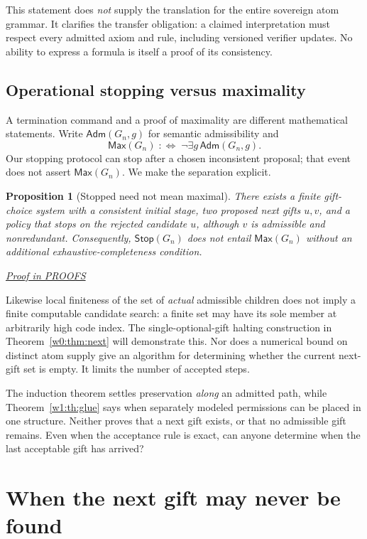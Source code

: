 \documentclass[11pt,letterpaper]{article}
\newtheorem{proposition}[theorem]{Proposition}
\theoremstyle{definition}\newtheorem{definition}[theorem]{Definition}\newtheorem{example}[theorem]{Example}
\theoremstyle{remark}\newtheorem{remark}[theorem]{Remark}
\newcommand{\Adm}{\mathsf{Adm}}
\newcommand{\prooflink}[1]{\par\noindent\hfill\small\hyperref[#1]{\textit{Proof in PROOFS}}\normalsize}
\begin{document}
This statement does \emph{not} supply the translation for the entire sovereign
atom grammar.  It clarifies the transfer obligation: a claimed interpretation
must respect every admitted axiom and rule, including versioned verifier
updates.  No ability to express a formula is itself a proof of its consistency.

\subsection{Operational stopping versus maximality}
A termination command and a proof of maximality are different mathematical statements. Write $\Adm(G_n,g)$ for semantic admissibility and
\[
 \mathsf{Max}(G_n)\;:\Longleftrightarrow\;\neg\exists g\,\Adm(G_n,g).
\]
Our stopping protocol can stop after a chosen inconsistent proposal; that event does not assert $\mathsf{Max}(G_n)$. We make the separation explicit.

\begin{proposition}[Stopped need not mean maximal]\label{w1:prop:stop}
There exists a finite gift-choice system with a consistent initial stage, two proposed next gifts $u,v$, and a policy that stops on the rejected candidate $u$, although $v$ is admissible and nonredundant. Consequently, $\mathsf{Stop}(G_n)$ does not entail $\mathsf{Max}(G_n)$ without an additional exhaustive-completeness condition.
\prooflink{w1:pr:stop}
\end{proposition}

Likewise local finiteness of the set of \emph{actual} admissible children does not imply a finite computable candidate search: a finite set may have its sole member at arbitrarily high code index. The single-optional-gift halting construction in Theorem~\ref{w0:thm:next} will demonstrate this. Nor does a numerical bound on distinct atom supply give an algorithm for determining whether the current next-gift set is empty. It limits the number of accepted steps.


The induction theorem settles preservation \emph{along} an admitted path,
while Theorem~\ref{w1:th:glue} says when separately modeled permissions can
be placed in one structure. Neither proves that a next gift exists, or that
no admissible gift remains. Even when the acceptance rule is exact, can
anyone determine when the last acceptable gift has arrived?

\section{When the next gift may never be found}
\end{document}
